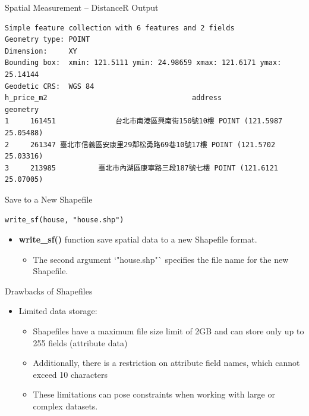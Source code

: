 \documentclass[dvipsnames,hyperref={pdfpagelabels=false}]{beamer}
\begin{document}
\begin{frame}[fragile]{Spatial Measurement -- Distance}{R Output}

\tiny

\begin{lstlisting}
Simple feature collection with 6 features and 2 fields
Geometry type: POINT
Dimension:     XY
Bounding box:  xmin: 121.5111 ymin: 24.98659 xmax: 121.6171 ymax: 25.14144
Geodetic CRS:  WGS 84
h_price_m2                                  address                  geometry
1     161451              台北市南港區興南街150號10樓 POINT (121.5987 25.05488)
2     261347 臺北市信義區安康里29鄰松勇路69巷10號17樓 POINT (121.5702 25.03316)
3     213985          臺北市內湖區康寧路三段187號七樓 POINT (121.6121 25.07005)
\end{lstlisting}


\end{frame}

\begin{frame}[fragile]{Save to a New Shapefile}
\begin{lstlisting}
write_sf(house, "house.shp")
\end{lstlisting}
\begin{itemize}
	\item \textbf{write\_sf()} function save spatial data to a new Shapefile format.
	\vspace{0.2cm}
	\begin{itemize}
		
		\item The second argument `"house.shp"` specifies the file name for the new Shapefile.
	\end{itemize}

\end{itemize}
\end{frame}


\begin{frame}[fragile]{Drawbacks of Shapefiles}
	\begin{itemize}
		
		\item Limited data storage:
		\vspace{0.2cm}
		\begin{itemize}
			\item Shapefiles have a maximum file size limit of 2GB and can store only up to 255 fields (attribute data)
			\vspace{0.2cm}
			\item Additionally, there is a restriction on attribute field names, which cannot exceed 10 characters
						\vspace{0.2cm}
			\item These limitations can pose constraints when working with large or complex datasets.
		\end{itemize}
	
	\end{itemize}
\end{frame}
\end{document}
